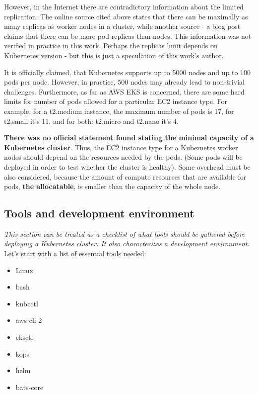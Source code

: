However, in the Internet there are contradictory information about the limited replication. The online source cited above\cite{kubernetes-node-size} states that there can be maximally as many replicas as worker nodes in a cluster, while another source - a blog post\cite{learnk8s-ll} claims that there can be more pod replicas than nodes. This information was not verified in practice in this work. Perhaps the replicas limit depends on Kubernetes version - but this is just a speculation of this work's author.

It is officially claimed, that Kubernetes supports up to 5000 nodes and up to 100 pods per node\cite{kubernetes-node-size}\cite{kubernetes-large}. However, in practice, 500 nodes may already lead to non-trivial challenges. Furthermore, as far as AWS EKS is concerned, there are some hard limits for number of pods allowed for a particular EC2 instance type. For example, for a t2.medium instance, the maximum number of pods is 17, for t2.small it's 11, and for both: t2.micro and t2.nano it's 4\cite{kubernetes-node-size}\cite{eks-hard-limits}.

\textbf{There was no official statement found stating the minimal capacity of a Kubernetes cluster}. Thus, the EC2 instance type for a Kubernetes worker nodes should depend on the resources needed by the pods. (Some pods will be deployed in order to test whether the cluster is healthy). Some overhead must be also considered, because the amount of compute resources that are available for pods, \textbf{the allocatable}, is smaller than the capacity of the whole node\cite{k8s-alloc}.

\subsection{Tools and development environment}
\label{tools}
\textit{This section can be treated as a checklist of what tools should be gathered before deploying a Kubernetes cluster. It also characterizes a development environment.}
\\

Let's start with a list of essential tools needed:
\begin{itemize}
\item Linux
\item bash
\item kubectl
\item aws cli 2
\item eksctl
\item kops
\item helm
\item bats-core
\end{itemize}

